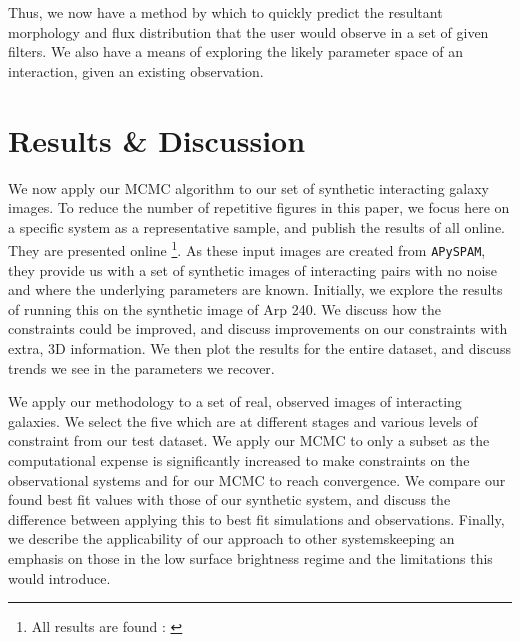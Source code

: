 Thus, we now have a method by which to quickly predict the resultant morphology and flux distribution that the user would observe in a set of given filters. We also have a means of exploring the likely parameter space of an interaction, given an existing observation.
\DIFdelbegin {}\DIFdelend 


\section{Results \& Discussion}\label{Results}
	\noindent We now apply our MCMC algorithm to our set of synthetic interacting galaxy images. To reduce the number of repetitive figures in this paper, we focus here on a specific system as a representative sample, and publish the results of all \DIFdelbegin {}\DIFdelend \DIFaddbegin {}\DIFaddend online. They are presented online \DIFaddbegin {}\DIFaddend \footnote{All results are found \DIFdelbegin {}\DIFdelend \DIFaddbegin {}\DIFaddend : \DIFdelbegin \href{https://drive.google.com/drive/folders/1hlFhrdoZ50JaEWWYoy0RZ3J4LSoRjmsq?usp=sharing}{}%
\DIFdelend \DIFaddbegin \href{https://doi.org/10.5281/zenodo.11532157
}{}\DIFaddend }. As these input images are created from \texttt{APySPAM}, they provide us with a set of synthetic images of interacting pairs with no noise and where the underlying parameters are known. Initially, we explore the results of running this on the synthetic image of Arp 240. We discuss how the constraints could be improved, and discuss improvements on our constraints with extra, 3D information. We then plot the results for the entire dataset, and discuss trends we see in the parameters we recover.

We apply our methodology to a set of real, observed images of interacting galaxies. We select the five which are at different stages and various levels of constraint from our test dataset. We apply our MCMC to only a subset as the computational expense is significantly increased to make constraints on the observational systems and for our MCMC to reach convergence. We compare our found best fit values with those of our synthetic system, and discuss the difference between applying this to best fit simulations and observations. Finally, we describe the applicability of our approach to other systems\DIFdelbegin \DIFdel{; }\DIFdelend \DIFaddbegin \DIFadd{, }\DIFaddend keeping an emphasis on those in the low surface brightness regime and the limitations this would introduce.

